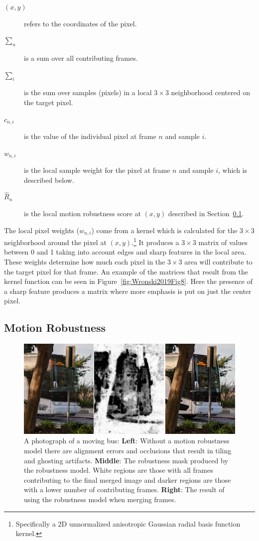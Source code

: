 \documentclass{sig-alternate}
\begin{document}
\begin{description}
  \item[$(x,y)$] refers to the coordinates of the pixel. 
  \item[$\sum_{n}$] is a sum over all contributing frames.
  \item[$\sum_{i}$] is the sum over samples (pixels) in a local $3\times 3$ neighborhood centered on the target pixel.
  \item[$c_{n, i}$] is the value of the individual pixel at frame $n$ and sample $i$.
  \item[$w_{n, i}$] is the local sample weight for the pixel at frame $n$ and sample $i$, which is described below. 
  \item[$\hat{R}_{n}$] is the local motion robustness score at $(x,y)$ described in Section~\ref{sec:robustnessModel}.
\end{description}

The local pixel weights ($w_{n, i}$) come from a kernel which is calculated for the $3\times 3$ neighborhood around the pixel at $(x,y)$.\footnote{Specifically a 2D unnormalized anisotropic Gaussian radial basis function kernel.} It produces a $3\times 3$ matrix of values between 0 and 1 taking into account edges and sharp features in the local area. These weights determine how much each pixel in the $3\times 3$ area will contribute to the target pixel for that frame. An example of the matrices that result from the kernel function can be seen in Figure~\ref{fig:Wronski2019Fig8}. Here the presence of a sharp feature produces a matrix where more emphasis is put on just the center pixel.

\pagebreak

\subsection{Motion Robustness}
\label{sec:robustnessModel}

\begin{figure}
\centering
\includegraphics[width=\columnwidth]{figures/wronski2019-figure-9-95quality.jpg}
\caption{A photograph of a moving bus: \textbf{Left}: Without a motion robustness model there are alignment errors and occlusions that result in tiling and ghosting artifacts. \textbf{Middle}: The robustness mask produced by the robustness model. White regions are those with all frames contributing to the final merged image and darker regions are those with a lower number of contributing frames. \textbf{Right}: The result of using the robustness model when merging frames. \cite{Wronski2019}}
\label{fig:Wronski2019Fig9}
\end{figure}
\end{document}
